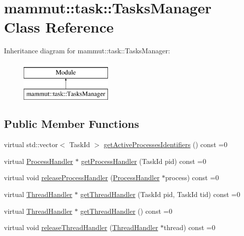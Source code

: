 \hypertarget{classmammut_1_1task_1_1TasksManager}{\section{mammut\-:\-:task\-:\-:Tasks\-Manager Class Reference}
\label{classmammut_1_1task_1_1TasksManager}
}
Inheritance diagram for mammut\-:\-:task\-:\-:Tasks\-Manager\-:\begin{figure}[H]
\begin{center}
\leavevmode
\includegraphics[height=2.000000cm]{classmammut_1_1task_1_1TasksManager}
\end{center}
\end{figure}
\subsection*{Public Member Functions}
\begin{DoxyCompactItemize}
\item 
virtual std\-::vector$<$ Task\-Id $>$ \hyperlink{classmammut_1_1task_1_1TasksManager_a301de447218cce0ae1f81af943ea6fe5}{get\-Active\-Processes\-Identifiers} () const =0
\item 
virtual \hyperlink{classmammut_1_1task_1_1ProcessHandler}{Process\-Handler} $\ast$ \hyperlink{classmammut_1_1task_1_1TasksManager_a529f75258ad54951209786ebfec1d658}{get\-Process\-Handler} (Task\-Id pid) const =0
\item 
virtual void \hyperlink{classmammut_1_1task_1_1TasksManager_ad97b2200f285f63f6e8858cce31422d3}{release\-Process\-Handler} (\hyperlink{classmammut_1_1task_1_1ProcessHandler}{Process\-Handler} $\ast$process) const =0
\item 
virtual \hyperlink{classmammut_1_1task_1_1ThreadHandler}{Thread\-Handler} $\ast$ \hyperlink{classmammut_1_1task_1_1TasksManager_a3c4a48df7d66c4fcf56c055d951d6bbe}{get\-Thread\-Handler} (Task\-Id pid, Task\-Id tid) const =0
\item 
virtual \hyperlink{classmammut_1_1task_1_1ThreadHandler}{Thread\-Handler} $\ast$ \hyperlink{classmammut_1_1task_1_1TasksManager_abf218ec9437ec3b6e2257715063b7262}{get\-Thread\-Handler} () const =0
\item 
virtual void \hyperlink{classmammut_1_1task_1_1TasksManager_af5ad5db5b43441a49e0a5633dd1ff667}{release\-Thread\-Handler} (\hyperlink{classmammut_1_1task_1_1ThreadHandler}{Thread\-Handler} $\ast$thread) const =0
\end{DoxyCompactItemize}


